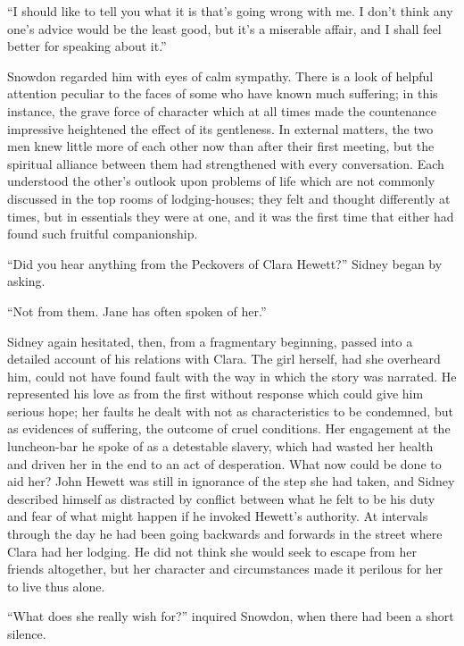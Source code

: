 ``I should like to tell you what it is that's going wrong with me. I
don't think any one's advice would be the least good, but it's
{\protect\hypertarget{246}{}{}}a miserable affair, and I shall feel
better for speaking about it.''

Snowdon regarded him with eyes of calm sympathy. There is a look of
helpful attention peculiar to the faces of some who have known much
suffering; in this instance, the grave force of character which at all
times made the countenance impressive heightened the effect of its
gentleness. In external matters, the two men knew little more of each
other now than after their first meeting, but the spiritual alliance
between them had strengthened with every conversation. Each understood
the other's outlook upon problems of life which are not commonly
discussed in the top rooms of lodging-houses; they felt and thought
differently at times, but in essentials they were at one, and it was the
first time that either had found such fruitful companionship.

``Did you hear anything from the Peckovers of Clara Hewett?'' Sidney
began by asking.

``Not from them. Jane has often spoken of her.''

{\protect\hypertarget{247}{}{}}Sidney again hesitated, then, from a
fragmentary beginning, passed into a detailed account of his relations
with Clara. The girl herself, had she overheard him, could not have
found fault with the way in which the story was narrated. He represented
his love as from the first without response which could give him serious
hope; her faults he dealt with not as characteristics to be condemned,
but as evidences of suffering, the outcome of cruel conditions. Her
engagement at the luncheon-bar he spoke of as a detestable slavery,
which had wasted her health and driven her in the end to an act of
desperation. What now could be done to aid her? John Hewett was still in
ignorance of the step she had taken, and Sidney described himself as
distracted by conflict between what he felt to be his duty and fear of
what might happen if he invoked Hewett's authority. At intervals through
the day he had been going backwards and forwards in the street where
Clara had her lodging. He did not think she would seek to escape from
her friends {\protect\hypertarget{248}{}{}}altogether, but her character
and circumstances made it perilous for her to live thus alone.

``What does she really wish for?'' inquired Snowdon, when there had been
a short silence.


